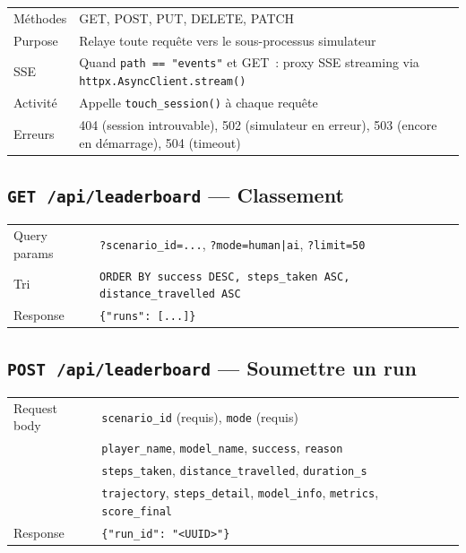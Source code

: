 \documentclass[a4paper, 11pt, french]{article}
\newcommand{\code}[1]{\texttt{#1}}
\newcommand{\apiendpoint}[2]{\texorpdfstring{\texttt{#1}~\texttt{#2}}{#1 #2}}
\begin{document}
\begin{table}[H]
\centering\small
\begin{tabular}{lp{10cm}}
\toprule
Méthodes & GET, POST, PUT, DELETE, PATCH \\
Purpose & Relaye toute requête vers le sous-processus simulateur \\
SSE & Quand \code{path == "events"} et GET~: proxy SSE streaming via
      \code{httpx.AsyncClient.stream()} \\
Activité & Appelle \code{touch\_session()} à chaque requête \\
Erreurs & 404 (session introuvable), 502 (simulateur en erreur),
          503 (encore en démarrage), 504 (timeout) \\
\bottomrule
\end{tabular}
\end{table}

\subsection{\apiendpoint{GET}{/api/leaderboard} --- Classement}

\begin{table}[H]
\centering\small
\begin{tabular}{lp{10cm}}
\toprule
Query params & \code{?scenario\_id=...}, \code{?mode=human|ai},
               \code{?limit=50} \\
Tri & \code{ORDER BY success DESC, steps\_taken ASC,
      distance\_travelled ASC} \\
Response & \code{\{"runs": [...]\}} \\
\bottomrule
\end{tabular}
\end{table}

\subsection{\apiendpoint{POST}{/api/leaderboard} --- Soumettre un run}

\begin{table}[H]
\centering\small
\begin{tabular}{lp{10cm}}
\toprule
Request body & \code{scenario\_id} (requis), \code{mode} (requis) \\
& \code{player\_name}, \code{model\_name}, \code{success}, \code{reason} \\
& \code{steps\_taken}, \code{distance\_travelled}, \code{duration\_s} \\
& \code{trajectory}, \code{steps\_detail}, \code{model\_info}, \code{metrics},
  \code{score\_final} \\
Response & \code{\{"run\_id": "<UUID>"\}} \\
\bottomrule
\end{tabular}
\end{table}
\end{document}
